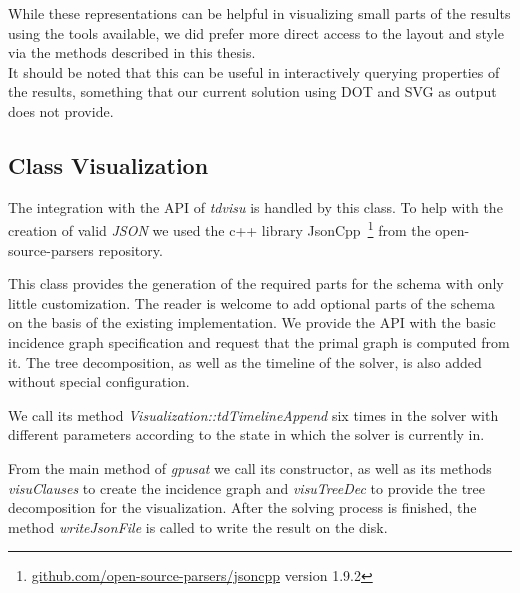 \documentclass[a4paper, 12pt, bibliography=totoc]{scrartcl}
\begin{document}
While these representations can be helpful in visualizing small parts of the results using the tools available, we did prefer more direct access to the layout and style via the methods described in this thesis.\\
It  should be noted that this can be useful in interactively querying properties of the results, something that our current solution using DOT and SVG as output does not provide.

\subsection{Class Visualization}

The integration with the API of \textit{tdvisu} is handled by this class.
To help with the creation of valid \textit{JSON} we used the c++ library JsonCpp~\footnote{\url{github.com/open-source-parsers/jsoncpp} version 1.9.2}  from the open-source-parsers repository. 

\medskip\noindent
This class provides the generation of the required parts for the schema with only little customization. The reader is welcome to add optional parts of the schema on the basis of the existing implementation.
We provide the API with the basic incidence graph specification and request that the primal graph is computed from it. The tree decomposition, as well as the timeline of the solver, is also added without special configuration.

We call its method \textit{Visualization::tdTimelineAppend} six times in the solver with different parameters according to the state in which the solver is currently in.

From the main method of \textit{gpusat} we call its constructor, as well as its methods \textit{visuClauses} to create the incidence graph and \textit{visuTreeDec} to provide the tree decomposition for the visualization. After the solving process is finished, the method \textit{writeJsonFile} is called to write the result on the disk.

\newpage
\end{document}
